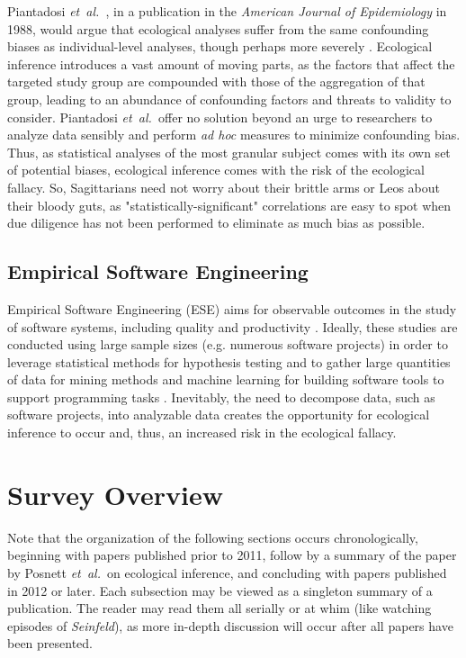 \documentclass{sig-alternate-05-2015}
\newcommand{\etal}{\mbox{\emph{et al.\ }}}
\begin{document}
Piantadosi \etal, in a publication in the \emph{American Journal of Epidemiology} in 1988, would argue that ecological analyses suffer from the same confounding biases as individual-level analyses, though perhaps more severely \cite{Piantadosi:1988}.  Ecological inference introduces a vast amount of moving parts, as the factors that affect the targeted study group are compounded with those of the aggregation of that group, leading to an abundance of confounding factors and threats to validity to consider. Piantadosi \etal offer no solution beyond an urge to researchers to analyze data sensibly and perform \emph{ad hoc} measures to minimize confounding bias.  Thus, as statistical analyses of the most granular subject comes with its own set of potential biases, ecological inference comes with the risk of the ecological fallacy.  So, Sagittarians need not worry about their brittle arms or Leos about their bloody guts, as "statistically-significant" correlations are easy to spot when due diligence has not been performed to eliminate as much bias as possible.

\subsection{Empirical Software Engineering}
Empirical Software Engineering (ESE) aims for observable outcomes in the study of software systems, including quality and productivity \cite{Posnett:2011}.  Ideally, these studies are conducted using large sample sizes (e.g. numerous software projects) in order to leverage statistical methods for hypothesis testing and to gather large quantities of data for mining methods and machine learning for building software tools to support programming tasks \cite{Posnett:2011}.  Inevitably, the need to decompose data, such as software projects, into analyzable data creates the opportunity for ecological inference to occur and, thus, an increased risk in the ecological fallacy.

\section{Survey Overview}

Note that the organization of the following sections occurs chronologically, beginning with papers published prior to 2011, follow by a summary of the paper by Posnett \etal on ecological inference, and concluding with papers published in 2012 or later. Each subsection may be viewed as a singleton summary of a publication.  The reader may read them all serially or at whim (like watching episodes of \emph{Seinfeld}), as more in-depth discussion will occur after all papers have been presented.
\end{document}
